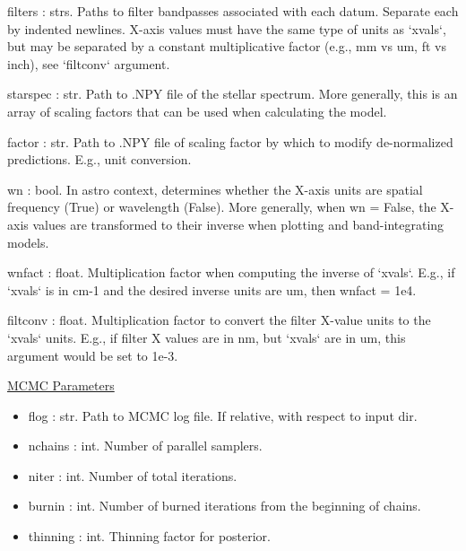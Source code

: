 \documentclass[letterpaper, 12pt]{article}
\begin{document}
\item filters     : strs. Paths to filter bandpasses associated with each datum. 
                    Separate each by indented newlines.
                    X-axis values must have the same type of units as `xvals`,
                    but may be separated by a constant multiplicative factor
                    (e.g., mm vs um, ft vs inch), see `filtconv` argument.
\item starspec    : str.  Path to .NPY file of the stellar spectrum.
                    More generally, this is an array of scaling factors that 
                    can be used when calculating the model.
\item factor      : str.  Path to .NPY file of scaling factor by which 
                    to modify de-normalized predictions. 
                    E.g., unit conversion.
\item wn          : bool. In astro context, determines whether the X-axis units are 
                    spatial frequency (True) or wavelength (False).
                    More generally, when wn = False, the X-axis values are 
                    transformed to their inverse when plotting and 
                    band-integrating models.  
\item wnfact      : float. Multiplication factor when computing the inverse of 
                     `xvals`.
                     E.g., if `xvals` is in cm-1 and the desired inverse units 
                     are um, then wnfact = 1e4.
\item filtconv    : float. Multiplication factor to convert the filter 
                     X-value units to the `xvals` units.
                     E.g., if filter X values are in nm, but `xvals` are in um, 
                     this argument would be set to 1e-3.


\noindent \underline{MCMC Parameters}
\begin{itemize}
\item flog        : str.  Path to MCMC log file. 
                          If relative, with respect to input dir.
\item nchains     : int.  Number of parallel samplers.
\item niter       : int.  Number of total iterations.
\item burnin      : int.  Number of burned iterations from the beginning of 
                          chains.
\item thinning    : int.  Thinning factor for posterior.
\end{itemize}
\end{document}

